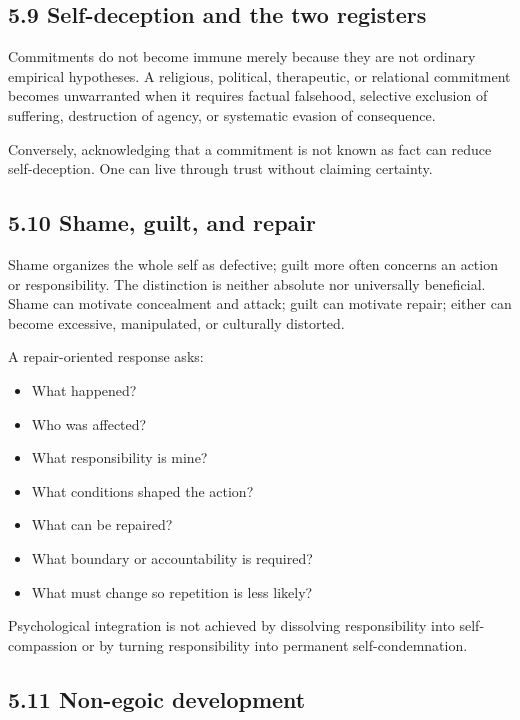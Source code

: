 \documentclass[
  11pt,
]{article}
\providecommand{\tightlist}{%
  \setlength{\itemsep}{0pt}\setlength{\parskip}{0pt}}
\begin{document}
\subsection{5.9 Self-deception and the two
registers}\label{self-deception-and-the-two-registers}

Commitments do not become immune merely because they are not ordinary
empirical hypotheses. A religious, political, therapeutic, or relational
commitment becomes unwarranted when it requires factual falsehood,
selective exclusion of suffering, destruction of agency, or systematic
evasion of consequence.

Conversely, acknowledging that a commitment is not known as fact can
reduce self-deception. One can live through trust without claiming
certainty.

\subsection{5.10 Shame, guilt, and repair}\label{shame-guilt-and-repair}

Shame organizes the whole self as defective; guilt more often concerns
an action or responsibility. The distinction is neither absolute nor
universally beneficial. Shame can motivate concealment and attack; guilt
can motivate repair; either can become excessive, manipulated, or
culturally distorted.

A repair-oriented response asks:

\begin{itemize}
\tightlist
\item
  What happened?
\item
  Who was affected?
\item
  What responsibility is mine?
\item
  What conditions shaped the action?
\item
  What can be repaired?
\item
  What boundary or accountability is required?
\item
  What must change so repetition is less likely?
\end{itemize}

Psychological integration is not achieved by dissolving responsibility
into self-compassion or by turning responsibility into permanent
self-condemnation.

\subsection{5.11 Non-egoic development}\label{non-egoic-development}
\end{document}
